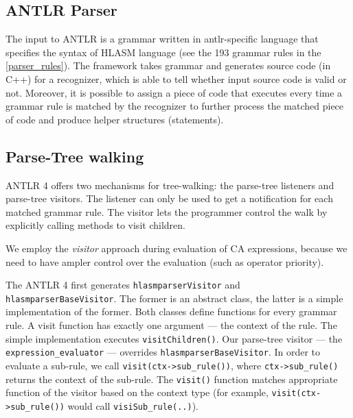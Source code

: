 \subsection{ANTLR Parser}

The input to ANTLR is a grammar written in antlr-specific language that specifies the syntax of HLASM language (see the 193 grammar rules in the \cref{parser_rules}). The framework takes grammar and generates source code (in C++) for a recognizer, which is able to tell whether input source code is valid or not. Moreover, it is possible to assign a piece of code that executes every time a grammar rule is matched by the recognizer to further process the matched piece of code and produce helper structures (statements).

\subsection{Parse-Tree walking}

ANTLR 4 offers two mechanisms for tree-walking: the parse-tree listeners and parse-tree visitors. The listener can only be used to get a notification for each matched grammar rule. The visitor lets the programmer control the walk by explicitly calling methods to visit children.

We employ the \emph{visitor} approach during evaluation of CA expressions, because we need to have ampler control over the evaluation (such as operator priority).

The ANTLR 4 first generates \texttt{hlasmparserVisitor} and \texttt{hlasmparserBaseVisitor}. The former is an abstract class, the latter is a simple implementation of the former. Both classes define  functions for every grammar rule. A visit function has exactly one argument --- the context of the rule. The simple implementation executes \texttt{visitChildren()}. Our parse-tree visitor --- the \texttt{expression\_evaluator} --- overrides \texttt{hlasmparserBaseVisitor}. In order to evaluate a sub-rule, we call \texttt{visit(ctx->sub\_rule())}, where \texttt{ctx->sub\_rule()} returns the context of the sub-rule. The \texttt{visit()} function matches appropriate function of the visitor based on the context type (for example, \texttt{visit(ctx->sub\_rule())} would call \texttt{visiSub\_rule(..)}).

